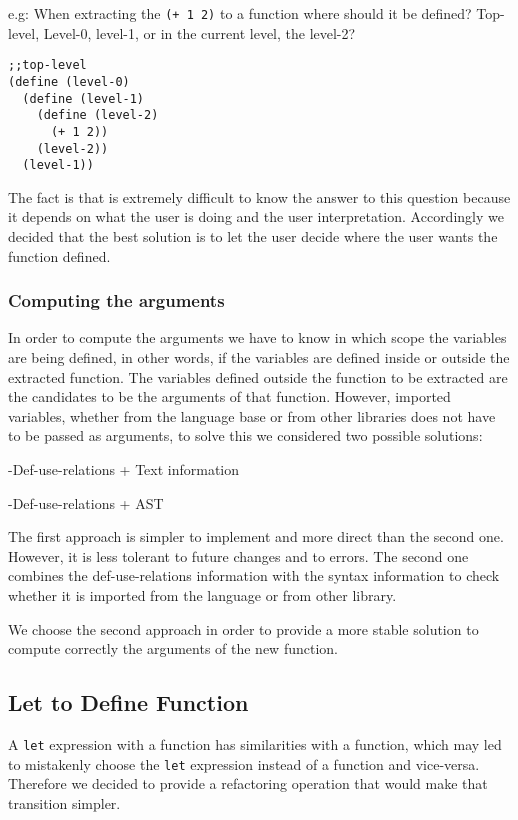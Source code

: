 e.g: When extracting the {\tt (+ 1 2)} to a function where should it be defined?
Top-level, Level-0, level-1, or in the current level, the level-2?
\begin{lstlisting}[basicstyle=\ttfamily, caption=Extract function levels]
;;top-level
(define (level-0)
  (define (level-1)
    (define (level-2)
      (+ 1 2))
    (level-2))
  (level-1))
\end{lstlisting}

The fact is that is extremely difficult to know the answer to this question because
it depends on what the user is doing and the user interpretation.
Accordingly we decided that the best solution is to let the user decide where
the user wants the function defined.


\subsubsection{Computing the arguments}

In order to compute the arguments we have to know in which scope the variables are being defined, in other words,
if the variables are defined inside or outside the extracted function. %
The variables defined outside the function to be extracted are the candidates to be the arguments %
of that function.
However, imported variables, whether from the language base or from other libraries
does not have to be passed as arguments, to solve this we considered two possible solutions:

  -Def-use-relations + Text information

  -Def-use-relations + AST

The first approach is simpler to implement and more direct than the second one.
However, it is less tolerant to future changes and to errors.
The second one combines the def-use-relations information with the syntax information to
check whether it is imported from the language or from other library.

We choose the second approach in order to provide a more stable solution to compute
 correctly the arguments of the new function.

\subsection{Let to Define Function} %

A {\tt let} expression with a function has similarities with a function, which may led
to mistakenly choose the {\tt let} expression instead of a function and vice-versa.
Therefore we decided to provide a refactoring operation that would make that transition simpler.

